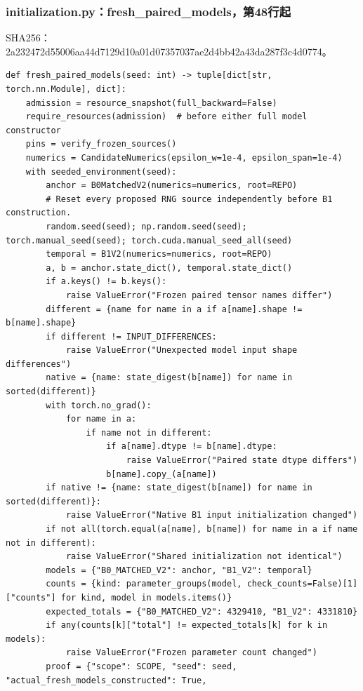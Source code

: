 \documentclass[UTF8,fontset=fandol,10pt]{ctexart}
\begin{document}
\subsubsection{initialization.py：fresh\_\allowbreak{}paired\_\allowbreak{}models，第48行起}

SHA256：2a232472d550\allowbreak{}06aa44d7129d\allowbreak{}10a01d073570\allowbreak{}37ae2d4bb42a\allowbreak{}43da287f3c4d\allowbreak{}0774。

\begin{lstlisting}
def fresh_paired_models(seed: int) -> tuple[dict[str, torch.nn.Module], dict]:
    admission = resource_snapshot(full_backward=False)
    require_resources(admission)  # before either full model constructor
    pins = verify_frozen_sources()
    numerics = CandidateNumerics(epsilon_w=1e-4, epsilon_span=1e-4)
    with seeded_environment(seed):
        anchor = B0MatchedV2(numerics=numerics, root=REPO)
        # Reset every proposed RNG source independently before B1 construction.
        random.seed(seed); np.random.seed(seed); torch.manual_seed(seed); torch.cuda.manual_seed_all(seed)
        temporal = B1V2(numerics=numerics, root=REPO)
        a, b = anchor.state_dict(), temporal.state_dict()
        if a.keys() != b.keys():
            raise ValueError("Frozen paired tensor names differ")
        different = {name for name in a if a[name].shape != b[name].shape}
        if different != INPUT_DIFFERENCES:
            raise ValueError("Unexpected model input shape differences")
        native = {name: state_digest(b[name]) for name in sorted(different)}
        with torch.no_grad():
            for name in a:
                if name not in different:
                    if a[name].dtype != b[name].dtype:
                        raise ValueError("Paired state dtype differs")
                    b[name].copy_(a[name])
        if native != {name: state_digest(b[name]) for name in sorted(different)}:
            raise ValueError("Native B1 input initialization changed")
        if not all(torch.equal(a[name], b[name]) for name in a if name not in different):
            raise ValueError("Shared initialization not identical")
        models = {"B0_MATCHED_V2": anchor, "B1_V2": temporal}
        counts = {kind: parameter_groups(model, check_counts=False)[1]["counts"] for kind, model in models.items()}
        expected_totals = {"B0_MATCHED_V2": 4329410, "B1_V2": 4331810}
        if any(counts[k]["total"] != expected_totals[k] for k in models):
            raise ValueError("Frozen parameter count changed")
        proof = {"scope": SCOPE, "seed": seed, "actual_fresh_models_constructed": True,

\end{lstlisting}
\end{document}

